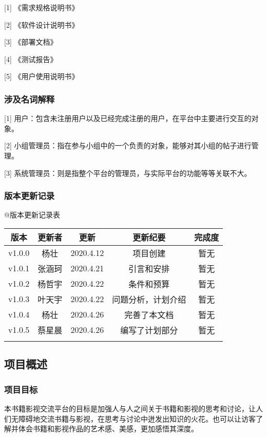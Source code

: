 \documentclass[
]{article}
\begin{document}
{[}1{]} 《需求规格说明书》

{[}2{]} 《软件设计说明书》

{[}3{]} 《部署文档》

{[}4{]} 《测试报告》

{[}5{]} 《用户使用说明书》

\hypertarget{header-n3125}{%
\subsubsection{涉及名词解释}\label{header-n3125}}

{[}1{]}
用户：包含未注册用户以及已经完成注册的用户，在平台中主要进行交互的对象。

{[}2{]}
小组管理员：指在参与小组中的一个负责的对象，能够对其小组的帖子进行管理。

{[}3{]}
系统管理员：则是指整个平台的管理员，与实际平台的功能等等关联不大。

\hypertarget{header-n3129}{%
\subsubsection{版本更新记录}\label{header-n3129}}

@版本更新记录表

\begin{longtable}[]{@{}ccccc@{}}
\toprule
版本 & 更新者 & 更新 & 更新纪要 & 完成度\tabularnewline
\midrule
\endhead
v1.0.0 & 杨壮 & 2020.4.12 & 项目创建 & 暂无\tabularnewline
v1.0.1 & 张涵珂 & 2020.4.21 & 引言和安排 & 暂无\tabularnewline
v1.0.2 & 杨哲宇 & 2020.4.22 & 条件和预算 & 暂无\tabularnewline
v1.0.3 & 叶天宇 & 2020.4.22 & 问题分析，计划介绍 & 暂无\tabularnewline
v1.0.4 & 杨壮 & 2020.4.26 & 完善了本文档 & 暂无\tabularnewline
v1.0.5 & 蔡星晨 & 2020.4.26 & 编写了计划部分 & 暂无\tabularnewline
& & & &\tabularnewline
\bottomrule
\end{longtable}

\hypertarget{header-n3180}{%
\subsection{项目概述}\label{header-n3180}}

\hypertarget{header-n3181}{%
\subsubsection{项目目标}\label{header-n3181}}

本书籍影视交流平台的目标是加强人与人之间关于书籍和影视的思考和讨论，让人们无障碍地交流书籍与影视，在思考与讨论中迸发出知识的火花。也可以让访客了解并体会书籍和影视作品的艺术感、美感，更加感悟其深度。
\end{document}
